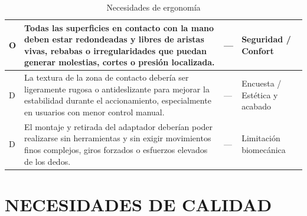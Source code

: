 \documentclass[11pt,a4paper]{article}
\begin{document}
\begin{table}[H]
\begin{tabular}{|p{2.8cm}|p{5.5cm}|p{2.5cm}|p{3.0cm}|}
\hline
O & Todas las superficies en contacto con la mano deben estar redondeadas y libres de aristas vivas, rebabas o irregularidades que puedan generar molestias, cortes o presión localizada. & --- & Seguridad / Confort \\
\hline
D & La textura de la zona de contacto debería ser ligeramente rugosa o antideslizante para mejorar la estabilidad durante el accionamiento, especialmente en usuarios con menor control manual. & --- & Encuesta / Estética y acabado \\
\hline
D & El montaje y retirada del adaptador deberían poder realizarse sin herramientas y sin exigir movimientos finos complejos, giros forzados o esfuerzos elevados de los dedos. & --- & Limitación biomecánica \\
\hline
\end{tabular}
\caption{Necesidades de ergonomía}
\end{table}

\newpage

\section{NECESIDADES DE CALIDAD}

\vspace{0.5cm}
\end{document}
